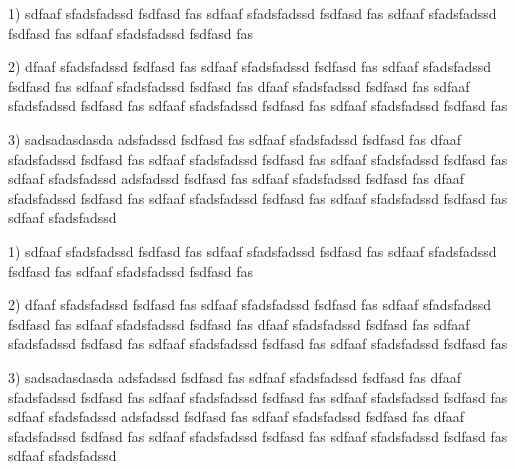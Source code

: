 \documentclass{eucaeuca}
\begin{document}
\author{Yucheng}
\maketitle


\begin{exercise}
\item[1)] sdfaaf sfadsfadssd fsdfasd fas sdfaaf sfadsfadssd fsdfasd fas sdfaaf sfadsfadssd fsdfasd fas sdfaaf sfadsfadssd fsdfasd fas
\item[2)]dfaaf sfadsfadssd fsdfasd fas sdfaaf sfadsfadssd fsdfasd fas sdfaaf sfadsfadssd fsdfasd fas sdfaaf sfadsfadssd fsdfasd fas dfaaf sfadsfadssd fsdfasd fas sdfaaf sfadsfadssd fsdfasd fas sdfaaf sfadsfadssd fsdfasd fas sdfaaf sfadsfadssd fsdfasd fas
\item[3)]sadsadasdasda adsfadssd fsdfasd fas sdfaaf sfadsfadssd fsdfasd fas dfaaf sfadsfadssd fsdfasd fas sdfaaf sfadsfadssd fsdfasd fas sdfaaf sfadsfadssd fsdfasd fas sdfaaf sfadsfadssd adsfadssd fsdfasd fas sdfaaf sfadsfadssd fsdfasd fas dfaaf sfadsfadssd fsdfasd fas sdfaaf sfadsfadssd fsdfasd fas sdfaaf sfadsfadssd fsdfasd fas sdfaaf sfadsfadssd
\end{exercise}
\begin{exercise}
\item[1)] sdfaaf sfadsfadssd fsdfasd fas sdfaaf sfadsfadssd fsdfasd fas sdfaaf sfadsfadssd fsdfasd fas sdfaaf sfadsfadssd fsdfasd fas
\item[2)]dfaaf sfadsfadssd fsdfasd fas sdfaaf sfadsfadssd fsdfasd fas sdfaaf sfadsfadssd fsdfasd fas sdfaaf sfadsfadssd fsdfasd fas dfaaf sfadsfadssd fsdfasd fas sdfaaf sfadsfadssd fsdfasd fas sdfaaf sfadsfadssd fsdfasd fas sdfaaf sfadsfadssd fsdfasd fas
\item[3)]sadsadasdasda adsfadssd fsdfasd fas sdfaaf sfadsfadssd fsdfasd fas dfaaf sfadsfadssd fsdfasd fas sdfaaf sfadsfadssd fsdfasd fas sdfaaf sfadsfadssd fsdfasd fas sdfaaf sfadsfadssd adsfadssd fsdfasd fas sdfaaf sfadsfadssd fsdfasd fas dfaaf sfadsfadssd fsdfasd fas sdfaaf sfadsfadssd fsdfasd fas sdfaaf sfadsfadssd fsdfasd fas sdfaaf sfadsfadssd
\end{exercise}
\begin{exercise}
\item[]
\end{exercise}
\end{document}
